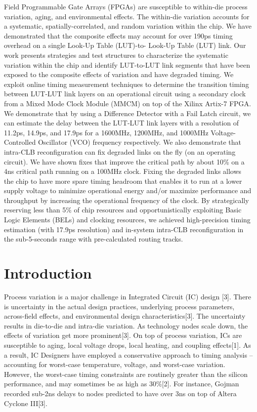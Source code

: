 \documentclass[11pt]{report}
\begin{document}
\begin{mainf}
Field Programmable Gate Arrays (FPGAs)  are susceptible to within-die process variation, aging, and environmental effects. The within-die variation accounts for a systematic, spatially-correlated, and random variation within the chip. We have demonstrated that the composite effects may account for over 190ps timing overhead on a single Look-Up Table (LUT)-to- Look-Up Table (LUT) link. Our work presents strategies and test structures to characterize the systematic variation within the chip and identify LUT-to-LUT link segments that have been exposed to the composite effects of variation and have degraded timing. We exploit online timing measurement techniques to determine the transition timing between LUT-LUT link layers on an operational circuit using a secondary clock from a Mixed Mode Clock Module (MMCM) on top of the Xilinx Artix-7 FPGA. We demonstrate that by using a Difference Detector with a Fail Latch circuit, we can estimate the delay between the LUT-LUT link layers with a resolution of  11.2ps, 14.9ps, and 17.9ps for a 1600MHz, 1200MHz, and 1000MHz Voltage-Controlled Oscillator (VCO) frequency respectively.  We also demonstrate that intra-CLB reconfiguration can fix degraded links on the fly (on an operating circuit). We have shown fixes that improve the critical path by about 10\% on a  4ns critical path running on a 100MHz clock.  Fixing the degraded links allows the chip to have more spare timing headroom that enables it to run at a lower supply voltage to minimize operational energy and/or maximize performance and throughput by increasing the operational frequency of the clock. By strategically reserving less than 5\% of chip resources and opportunistically exploiting Basic Logic Elements (BELs) and clocking resources, we achieved high-precision timing estimation (with 17.9ps resolution) and in-system intra-CLB reconfiguration in the sub-5-seconds range with pre-calculated routing tracks. 

\newpage

\section{\textbf{Introduction}}

Process variation is a major challenge in Integrated Circuit (IC) design [3]. There is uncertainty in the actual design practices, underlying process parameters, across-field effects, and environmental design characteristics[3]. The uncertainty results in die-to-die and intra-die variation. As technology nodes scale down, the effects of variation get more prominent[3]. On top of process variation, ICs are susceptible to aging, local voltage drops, local heating, and coupling effects[1]. As a result, IC Designers have employed a conservative approach to timing analysis -- accounting for worst-case temperature, voltage, and worst-case variation. However, the worst-case timing constraints are routinely greater than the silicon performance, and may sometimes be as high as 30\%[2]. For instance,  Gojman recorded sub-2ns delays to nodes predicted to have over 3ns on top of Altera Cyclone III[3]. 


\end{mainf}
\end{document}
